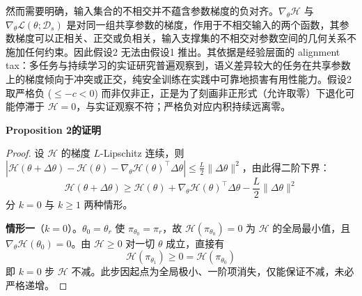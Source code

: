 \documentclass[lettersize,journal]{IEEEtran}
\begin{document}
然而需要明确，输入集合的不相交并不蕴含参数梯度的负对齐。$\nabla_\theta \mathcal{H}$ 与 $\nabla_\theta \mathcal{L}(\theta; \mathcal{D}_s)$ 是对同一组共享参数的梯度，作用于不相交输入的两个函数，其参数梯度可以正相关、正交或负相关，输入支撑集的不相交对参数空间的几何关系不施加任何约束。因此假设2 无法由假设1 推出。其依据是经验层面的 alignment tax：多任务与持续学习的实证研究普遍观察到，语义差异较大的任务在共享参数上的梯度倾向于冲突或正交\cite{yu2020gradient, kirkpatrick2017overcoming}，纯安全训练在实践中可靠地损害有用性能力。假设2 取严格负 ($\leq -c < 0$) 而非仅非正，正是为了刻画非正形式（允许取零）下退化可能停滞于 $\mathcal{H} = 0$，与实证观察不符；严格负对应内积持续远离零。
 
\textbf{Proposition 2的证明}
\begin{proof}
设 $\mathcal{H}$ 的梯度 $L$-Lipschitz 连续，则 $|\mathcal{H}(\theta+\Delta\theta) - \mathcal{H}(\theta) - \nabla_\theta\mathcal{H}(\theta)^\top\Delta\theta| \leq \frac{L}{2}\|\Delta\theta\|^2$，由此得二阶下界：
\begin{equation}\label{eq:descent-lemma}
    \mathcal{H}(\theta + \Delta\theta) \geq \mathcal{H}(\theta) 
    + \nabla_\theta \mathcal{H}(\theta)^\top \Delta\theta 
    - \frac{L}{2}\|\Delta\theta\|^2
\end{equation}
分 $k = 0$ 与 $k \geq 1$ 两种情形。
 
\textbf{情形一}（$k = 0$）。$\theta_0 = \theta_r$ 使 $\pi_{\theta_0} = \pi_r$，故 $\mathcal{H}(\pi_{\theta_0}) = 0$ 为 $\mathcal{H}$ 的全局最小值，且 $\nabla_\theta \mathcal{H}(\theta_0) = 0$。由 $\mathcal{H} \geq 0$ 对一切 $\theta$ 成立，直接有
\begin{equation}
    \mathcal{H}(\pi_{\theta_1}) \geq 0 = \mathcal{H}(\pi_{\theta_0})
\end{equation}
即 $k = 0$ 步 $\mathcal{H}$ 不减。此步因起点为全局极小、一阶项消失，仅能保证不减，未必严格递增。
 

\end{proof}
\end{document}
